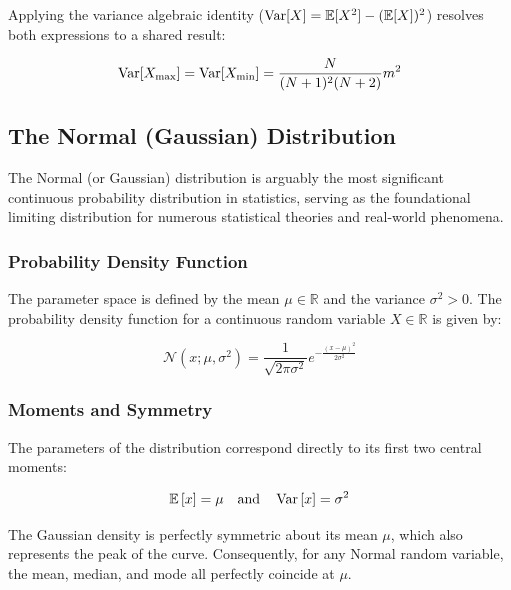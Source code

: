 Applying the variance algebraic identity ($\operatorname{Var}[X] = \mathbb{E}[X^2] - (\mathbb{E}[X])^2$) resolves both expressions to a shared result:

\begin{equation}
	\operatorname{Var}[X_{\max}] = \operatorname{Var}[X_{\min}] = \frac{N}{(N+1)^2(N+2)}m^2
	\label{eq:uniform_extremum_var}
\end{equation}

\clearpage
\subsection{The Normal (Gaussian) Distribution}

The Normal (or Gaussian) distribution is arguably the most significant continuous probability distribution in statistics, serving as the foundational limiting distribution for numerous statistical theories and real-world phenomena.

\subsubsection{Probability Density Function}
The parameter space is defined by the mean $\mu \in \mathbb{R}$ and the variance $\sigma^2 > 0$. The probability density function for a continuous random variable $X \in \mathbb{R}$ is given by:

\begin{equation}
	\mathcal{N}\left(x;\mu,\sigma^2\right) = \frac{1}{\sqrt{2\pi\sigma^2}}e^{-\frac{\left(x-\mu\right)^2}{2\sigma^2}}
	\label{pmf:normal}
\end{equation}

\subsubsection{Moments and Symmetry}
The parameters of the distribution correspond directly to its first two central moments:

\[
\mathbb{E}\left[x\right] = \mu \quad \text{and} \quad \operatorname{Var}\left[x\right] = \sigma^2
\]

The Gaussian density is perfectly symmetric about its mean $\mu$, which also represents the peak of the curve. Consequently, for any Normal random variable, the mean, median, and mode all perfectly coincide at $\mu$.

